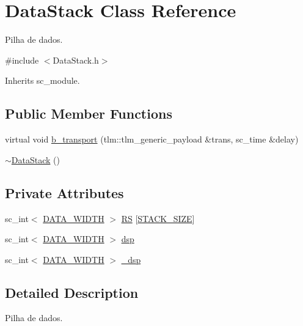 \hypertarget{classDataStack}{\section{Data\+Stack Class Reference}
\label{classDataStack}
}


Pilha de dados.  




{\ttfamily \#include $<$Data\+Stack.\+h$>$}



Inherits sc\+\_\+module.

\subsection*{Public Member Functions}
\begin{DoxyCompactItemize}
\item 
virtual void \hyperlink{classDataStack_aa3b9a31c5da46278b9edcdb83419c902}{b\+\_\+transport} (tlm\+::tlm\+\_\+generic\+\_\+payload \&trans, sc\+\_\+time \&delay)
\item 
\hyperlink{classDataStack_a3521eabae3f1c0033b6eb26578e67b5d}{$\sim$\+Data\+Stack} ()
\end{DoxyCompactItemize}
\subsection*{Private Attributes}
\begin{DoxyCompactItemize}
\item 
sc\+\_\+int$<$ \hyperlink{Defines_8h_af087b76f9707be9d3b43ba0c782c31c3}{D\+A\+T\+A\+\_\+\+W\+I\+D\+T\+H} $>$ \hyperlink{classDataStack_a096402db3243ca7cb735097c6f507464}{R\+S} \mbox{[}\hyperlink{Defines_8h_a6423a880df59733d2d9b509c7718d3a9}{S\+T\+A\+C\+K\+\_\+\+S\+I\+Z\+E}\mbox{]}
\item 
sc\+\_\+int$<$ \hyperlink{Defines_8h_af087b76f9707be9d3b43ba0c782c31c3}{D\+A\+T\+A\+\_\+\+W\+I\+D\+T\+H} $>$ \hyperlink{classDataStack_a98e11c938a1afac35622e5fb2ed6f9fa}{dsp}
\item 
sc\+\_\+int$<$ \hyperlink{Defines_8h_af087b76f9707be9d3b43ba0c782c31c3}{D\+A\+T\+A\+\_\+\+W\+I\+D\+T\+H} $>$ \hyperlink{classDataStack_a3a4d8a30f9335fbea81c515bd03fa2f2}{\+\_\+dsp}
\end{DoxyCompactItemize}


\subsection{Detailed Description}
Pilha de dados. 

